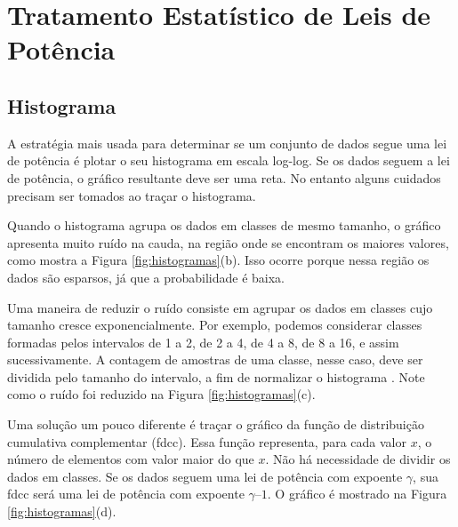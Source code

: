 \documentclass{article}
\begin{document}
\section{Tratamento Estatístico de Leis de Potência} \label{sec:estatistica}

\subsection{Histograma}

A estratégia mais usada para determinar se um conjunto de dados segue uma lei de potência é plotar o seu histograma em escala log-log. Se os dados seguem a lei de potência, o gráfico resultante deve ser uma reta. No entanto alguns cuidados precisam ser tomados ao traçar o histograma.

Quando o histograma agrupa os dados em classes de mesmo tamanho, o gráfico apresenta muito ruído na cauda, na região onde se encontram os maiores valores, como mostra a Figura \ref{fig:histogramas}(b). Isso ocorre porque nessa região os dados são esparsos, já que a probabilidade é baixa.

Uma maneira de reduzir o ruído consiste em agrupar os dados em classes cujo tamanho cresce exponencialmente. Por exemplo, podemos considerar classes formadas pelos intervalos de 1 a 2, de 2 a 4, de 4 a 8, de 8 a 16, e assim sucessivamente. A contagem de amostras de uma classe, nesse caso, deve ser dividida pelo tamanho do intervalo, a fim de normalizar o histograma \cite{Newman2005}. Note como o ruído foi reduzido na Figura \ref{fig:histogramas}(c).

Uma solução um pouco diferente é traçar o gráfico da função de distribuição cumulativa complementar (fdcc). Essa função representa, para cada valor $x$, o número de elementos com valor maior do que $x$. Não há necessidade de dividir os dados em classes. Se os dados seguem uma lei de potência com expoente $\gamma$, sua fdcc será uma lei de potência com expoente $\gamma – 1$. O gráfico é mostrado na Figura \ref{fig:histogramas}(d).
\end{document}
